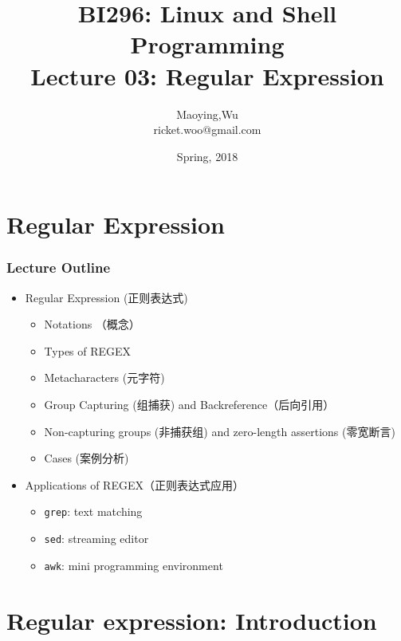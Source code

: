 \documentclass[red]{beamer}
\title[BI296-Lec03]{\tiny{BI296: Linux and Shell Programming}\\
\Large{Lecture 03: Regular Expression}}
\author[Maoying Wu]{Maoying,Wu\\
{\scriptsize ricket.woo@gmail.com}}
\institute[CBB] %
{
  \inst{}
  Dept. of Bioinformatics \& Biostatistics\\
  Shanghai Jiao Tong University
}
\date{Spring, 2018}
\begin{document}
\begin{CJK*}{UTF8}{gbsn}
\frame{\titlepage}

\section{Regular Expression}

\begin{frame}
\frametitle{Lecture Outline}
\begin{itemize}
	\item Regular Expression (正则表达式)
	\begin{itemize}
		\item Notations （概念）
		\item Types of REGEX
		\item Metacharacters (元字符)
		\item Group Capturing (组捕获) and Backreference（后向引用）
		\item Non-capturing groups (非捕获组) and zero-length assertions (零宽断言)
		\item Cases (案例分析)
	\end{itemize}
	\vspace{0.2in}
	\item Applications of REGEX（正则表达式应用）
	\begin{itemize}
		\item \lstinline{grep}: text matching
		\item \lstinline{sed}: streaming editor
		\item \lstinline{awk}: mini programming environment
	\end{itemize}
\end{itemize}
\end{frame}

\section{Regular expression: Introduction}


\end{CJK*}
\end{document}
